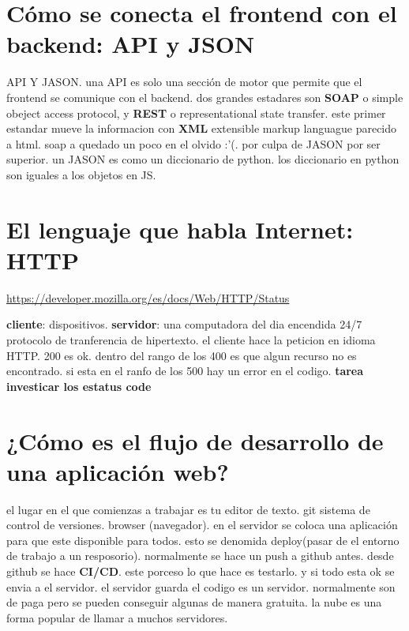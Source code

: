 \documentclass{article}
\begin{document}
    \section{Cómo se conecta el frontend con el backend: API y JSON}
    API Y JASON.
    una API es solo una sección de motor que permite que el frontend se comunique con el backend.
    dos grandes estadares son \textbf{SOAP} o simple obeject access protocol, y \textbf{REST} o representational state transfer.
    este primer estandar mueve la informacion con \textbf{XML} extensible markup languague parecido a html.
    soap a quedado un poco en el olvido :'(. 
    por culpa de JASON por ser superior. 
    un JASON es como un diccionario de python.
    los diccionario en python son iguales a los objetos en JS.
    \section{El lenguaje que habla Internet: HTTP}

    \url{https://developer.mozilla.org/es/docs/Web/HTTP/Status}

    \textbf{cliente}: dispositivos. \textbf{servidor}: una computadora del dia encendida 24/7
    protocolo de tranferencia de hipertexto. el cliente hace la peticion en idioma HTTP.
    200 es ok. dentro del rango de los 400 es que algun recurso no es encontrado. 
    si esta en el ranfo de los 500 hay un error en el codigo.
    \textbf{tarea investicar los estatus code}
    \section{¿Cómo es el flujo de desarrollo de una aplicación web?}
    el lugar en el que comienzas a trabajar es tu editor de texto. git sistema de control de versiones.
    browser (navegador). 
    en el servidor se coloca una aplicación para que este disponible para todos.
    esto se denomida deploy(pasar de el entorno de trabajo a un resposorio). normalmente se hace un push a github antes.
    desde github se hace \textbf{CI/CD}. este porceso lo que hace es testarlo. y si todo esta ok se envia a el servidor.
    el servidor guarda el codigo es un servidor. normalmente son de paga pero se pueden conseguir algunas de manera gratuita.
    la nube es una forma popular de llamar a muchos servidores.
\end{document}
